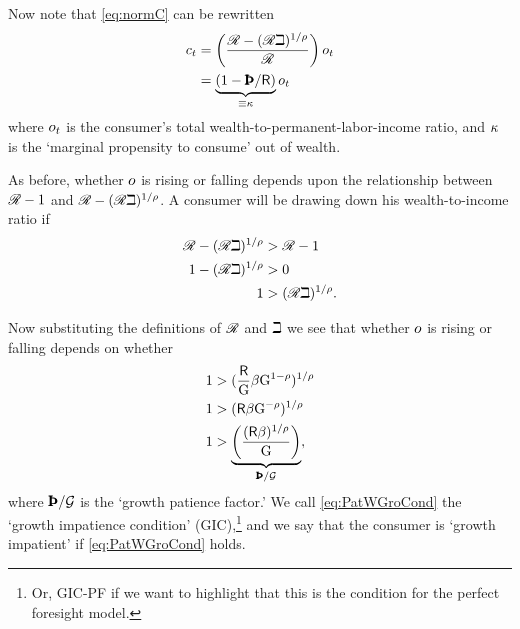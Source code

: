 \documentclass{scrartcl}
\begin{document}
Now note that \eqref{eq:normC} can be rewritten
\begin{equation}\begin{gathered}\begin{aligned}
        \cNrm_{t} & =  \left(\frac{\RNrmByG-(\RNrmByG\DiscAlt)^{1/\CRRA}}{\RNrmByG}\right)\oNrm_{t}
\\ & =  \underbrace{(1 - \RPFac)}_{\equiv \MPC} \oNrm_{t}
\end{aligned}\end{gathered}\end{equation}
where $o_{t}$ is the consumer's total wealth-to-permanent-labor-income 
ratio, and $\kappa$ is the `marginal propensity to consume' out of wealth.

As before, whether $o$ is rising or falling depends upon the 
relationship between $\mathscr{R}-1$ and 
$\mathscr{R}-(\mathscr{R}\beth)^{1/\rho}$.
A consumer will be 
drawing down his wealth-to-income ratio if
\begin{equation}\begin{gathered}\begin{aligned}
        \mathscr{R}-(\mathscr{R}\beth)^{1/\rho} & >  \mathscr{R}-1  \\
        1-(\mathscr{R}\beth)^{1/\rho} & >  0  \\
        1 & >  (\mathscr{R}\beth)^{1/\rho}
.
\end{aligned}\end{gathered}\end{equation}

Now substituting the definitions of $\mathscr{R}$ and $\beth$
we see that whether $o$ is rising or falling depends on whether
\begin{equation}\begin{gathered}\begin{aligned}
        1 & >  (\frac{\Rfree}{{\WGroFac}}\DiscFac {\WGroFac}^{1-\CRRA})^{1/\CRRA}
\\  1 & >  (\Rfree\DiscFac {\WGroFac}^{-\CRRA})^{1/\CRRA}
\\  1 & >  \underbrace{\left(\frac{(\Rfree\DiscFac)^{1/\CRRA}}{\WGroFac}\right)}_{\GPFac} \label{eq:PatWGroCond}
,
\end{aligned}\end{gathered}\end{equation}
where $\GPFac$ is the `growth patience factor.'
We call \eqref{eq:PatWGroCond} the `growth impatience condition' (GIC),\footnote{Or, GIC-PF if we want to highlight that this is the condition for the perfect foresight model.} and we say that the consumer is
`growth impatient' if \eqref{eq:PatWGroCond} holds.
\end{document}
